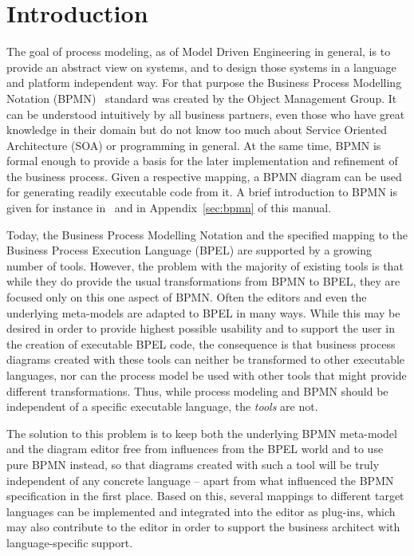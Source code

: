 \chapter{Introduction}


The goal of process modeling, as of Model Driven Engineering in general, is to
provide an abstract view on systems, and to design those systems in a language
and platform independent way.  For that purpose the Business Process Modelling
Notation (BPMN)~\cite{omg2009bpmn} standard was created by the Object Management
Group.  It can be understood intuitively by all business partners, even those who
have great knowledge in their domain but do not know too much about Service
Oriented Architecture (SOA) or programming in general.  At the same time, BPMN is
formal enough to provide a basis for the later implementation and refinement of
the business process.  Given a respective mapping, a BPMN diagram can be used for
generating readily executable code from it.  A brief introduction to BPMN is given
for instance in~\cite{white2004introduction} and in Appendix~\ref{sec:bpmn} of
this manual.

Today, the Business Process Modelling Notation and the specified mapping to the
Business Process Execution Language (BPEL) are supported by a growing number of
tools.  However, the problem with the majority of existing tools is that while
they do provide the usual transformations from BPMN to BPEL, they are focused
only on this one aspect of BPMN.  Often the editors and even the underlying
meta-models are adapted to BPEL in many ways.  While this may be desired in order
to provide highest possible usability and to support the user in the creation of
executable BPEL code, the consequence is that business process diagrams created
with these tools can neither be transformed to other executable languages, nor
can the process model be used with other tools that might provide different
transformations.  Thus, while process modeling and BPMN should be independent of
a specific executable language, the \emph{tools} are not.

The solution to this problem is to keep both the underlying BPMN meta-model and
the diagram editor free from influences from the BPEL world and to use pure BPMN
instead, so that diagrams created with such a tool will be truly independent of
any concrete language -- apart from what influenced the BPMN specification in
the first place.  Based on this, several mappings to different target languages
can be implemented and integrated into the editor as plug-ins, which may also
contribute to the editor in order to support the business architect with
language-specific support.

